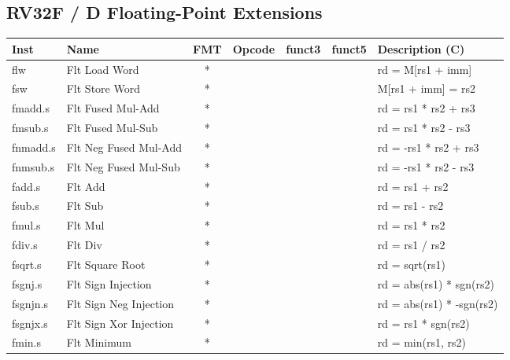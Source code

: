 \subsection*{RV32F / D Floating-Point Extensions}

\begin{center}
\begin{tabular}
{| T | l | c | T | T | T | T |} \hline
\rmfamily Inst  & Name                  & FMT   & \rmfamily Opcode & \rmfamily funct3 & \rmfamily funct5 & \rmfamily Description (C)         \\ \hline
flw       & Flt Load Word         & *     &            &        &        & rd = M[rs1 + imm]    \\
fsw       & Flt Store Word        & *     &            &        &        & M[rs1 + imm] = rs2   \\
fmadd.s   & Flt Fused Mul-Add     & *     &            &        &        & rd = rs1 * rs2 + rs3 \\
fmsub.s   & Flt Fused Mul-Sub     & *     &            &        &        & rd = rs1 * rs2 - rs3 \\
fnmadd.s  & Flt Neg Fused Mul-Add & *     &            &        &        & rd = -rs1 * rs2 + rs3 \\
fnmsub.s  & Flt Neg Fused Mul-Sub & *     &            &        &        & rd = -rs1 * rs2 - rs3 \\
fadd.s    & Flt Add               & *     &            &        &        & rd = rs1 + rs2       \\
fsub.s    & Flt Sub               & *     &            &        &        & rd = rs1 - rs2       \\
fmul.s    & Flt Mul               & *     &            &        &        & rd = rs1 * rs2       \\
fdiv.s    & Flt Div               & *     &            &        &        & rd = rs1 / rs2       \\
fsqrt.s   & Flt Square Root       & *     &            &        &        & rd = sqrt(rs1)       \\
fsgnj.s   & Flt Sign Injection    & *     &            &        &        & rd = abs(rs1) * sgn(rs2) \\
fsgnjn.s  & Flt Sign Neg Injection& *     &            &        &        & rd = abs(rs1) * -sgn(rs2) \\
fsgnjx.s  & Flt Sign Xor Injection& *     &            &        &        & rd = rs1 * sgn(rs2)  \\
fmin.s    & Flt Minimum           & *     &            &        &        & rd = min(rs1, rs2)   \\

\end{tabular}
\end{center}
